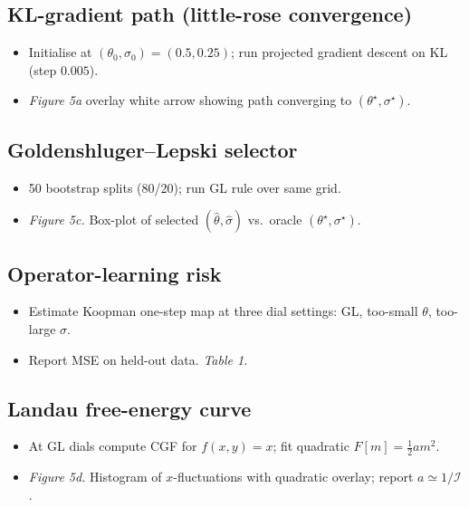 \documentclass{article}
\theoremstyle{plain}
\theoremstyle{definition}
\theoremstyle{remark}
\begin{document}
	\subsection{KL-gradient path (little-rose convergence)}
		\begin{itemize}[nosep,leftmargin=*]
  			\item Initialise at $(\theta_0,\sigma_0)=(0.5,0.25)$; run projected gradient descent on KL (step \(0.005\)).
  			
			\item \emph{Figure 5a} overlay white arrow showing path converging to $(\theta^\star,\sigma^\star)$.
		\end{itemize}

	\subsection{Goldenshluger–Lepski selector}
		\begin{itemize}[nosep,leftmargin=*]
  			\item 50 bootstrap splits (80/20); run GL rule over same grid.
  	
			\item \emph{Figure 5c.} Box-plot of selected $(\hat\theta,\hat\sigma)$ vs.\ oracle $(\theta^\star,\sigma^\star)$.
		\end{itemize}

	\subsection{Operator-learning risk}
		
		\begin{itemize}[nosep,leftmargin=*]
 			 \item Estimate Koopman one-step map at three dial settings:  GL, too-small $\theta$, too-large $\sigma$.
 			
			 \item Report MSE on held-out data.  \emph{Table 1.}
		\end{itemize}

		\subsection{Landau free-energy curve}
			
			\begin{itemize}[nosep,leftmargin=*]
 				 \item At GL dials compute CGF for \(f(x,y)=x\); fit quadratic \(F[m]=\tfrac12 a m^{2}\).
				 
				 \item \emph{Figure 5d.}  Histogram of $x$-fluctuations with quadratic overlay; report \(a\simeq1/\mathcal I\).
			\end{itemize}
\end{document}
